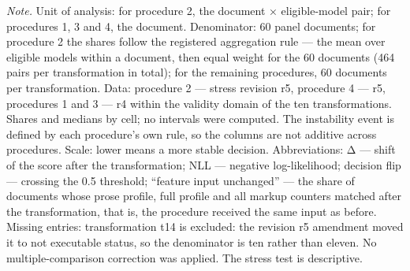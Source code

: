 \begin{table}[htbp]
\begin{minipage}{\linewidth}
\textit{Note.} Unit of analysis: for procedure 2, the document × eligible-model pair; for procedures 1, 3 and 4, the document. Denominator: 60 panel documents; for procedure 2 the shares follow the registered aggregation rule — the mean over eligible models within a document, then equal weight for the 60 documents (464 pairs per transformation in total); for the remaining procedures, 60 documents per transformation. Data: procedure 2 — stress revision r5, procedure 4 — r5, procedures 1 and 3 — r4 within the validity domain of the ten transformations. Shares and medians by cell; no intervals were computed. The instability event is defined by each procedure's own rule, so the columns are not additive across procedures. Scale: lower means a more stable decision. Abbreviations: Δ — shift of the score after the transformation; NLL — negative log-likelihood; decision flip — crossing the 0.5 threshold; ``feature input unchanged'' — the share of documents whose prose profile, full profile and all markup counters matched after the transformation, that is, the procedure received the same input as before. Missing entries: transformation t14 is excluded: the revision r5 amendment moved it to not executable status, so the denominator is ten rather than eleven. No multiple-comparison correction was applied. The stress test is descriptive.
\end{minipage}
\end{table}
